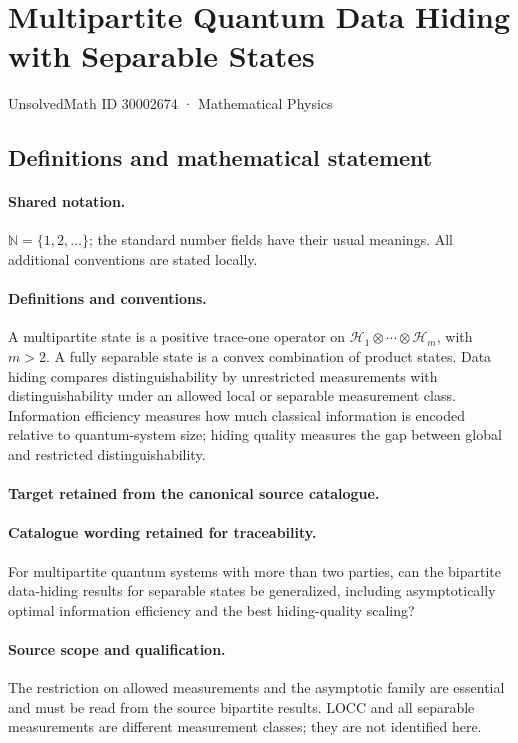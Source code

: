 \documentclass[11pt]{article}
\begin{document}
\setcounter{section}{30002673}
\section{Multipartite Quantum Data Hiding with Separable States}\label{30002674}
{\small UnsolvedMath ID 30002674 · Mathematical Physics}
\subsection{Definitions and mathematical statement}

\paragraph{Shared notation.}$\mathbb N=\{1,2,\ldots\}$; the standard number fields have their usual meanings. All additional conventions are stated locally.


\paragraph{Definitions and conventions.}
A multipartite state is a positive trace-one operator on $\mathcal H_1\otimes\cdots\otimes\mathcal H_m$, with $m>2$. A fully separable state is a convex combination of product states. Data hiding compares distinguishability by unrestricted measurements with distinguishability under an allowed local or separable measurement class. Information efficiency measures how much classical information is encoded relative to quantum-system size; hiding quality measures the gap between global and restricted distinguishability.

\paragraph{Target retained from the canonical source catalogue.}
\paragraph{Catalogue wording retained for traceability.}
For multipartite quantum systems with more than two parties, can the bipartite data-hiding results for separable states be generalized, including asymptotically optimal information efficiency and the best hiding-quality scaling?

\paragraph{Source scope and qualification.}
The restriction on allowed measurements and the asymptotic family are essential and must be read from the source bipartite results. LOCC and all separable measurements are different measurement classes; they are not identified here.
\end{document}
